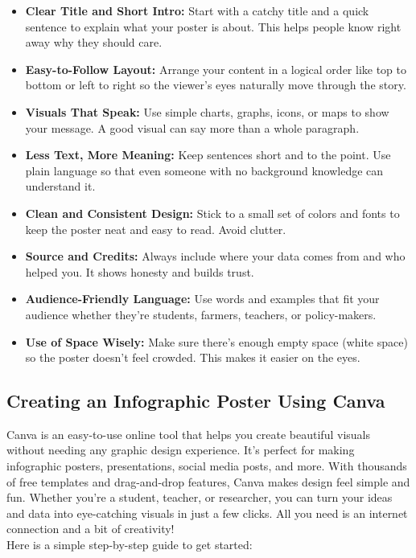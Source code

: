 \begin{itemize}
    \item \textbf{Clear Title and Short Intro:} Start with a catchy title and a quick sentence to explain what your poster is about. This helps people know right away why they should care.

    \item \textbf{Easy-to-Follow Layout:} Arrange your content in a logical order like top to bottom or left to right so the viewer’s eyes naturally move through the story.

    \item \textbf{Visuals That Speak:} Use simple charts, graphs, icons, or maps to show your message. A good visual can say more than a whole paragraph.

    \item \textbf{Less Text, More Meaning:} Keep sentences short and to the point. Use plain language so that even someone with no background knowledge can understand it.

    \item \textbf{Clean and Consistent Design:} Stick to a small set of colors and fonts to keep the poster neat and easy to read. Avoid clutter.

    \item \textbf{Source and Credits:} Always include where your data comes from and who helped you. It shows honesty and builds trust.

    \item \textbf{Audience-Friendly Language:} Use words and examples that fit your audience whether they’re students, farmers, teachers, or policy-makers.

    \item \textbf{Use of Space Wisely:} Make sure there’s enough empty space (white space) so the poster doesn’t feel crowded. This makes it easier on the eyes.

\end{itemize}


\subsection*{Creating an Infographic Poster Using Canva}

Canva is an easy-to-use online tool that helps you create beautiful visuals without needing any graphic design experience. It’s perfect for making infographic posters, presentations, social media posts, and more. With thousands of free templates and drag-and-drop features, Canva makes design feel simple and fun. Whether you're a student, teacher, or researcher, you can turn your ideas and data into eye-catching visuals in just a few clicks. All you need is an internet connection and a bit of creativity!\\
Here is a simple step-by-step guide to get started:

